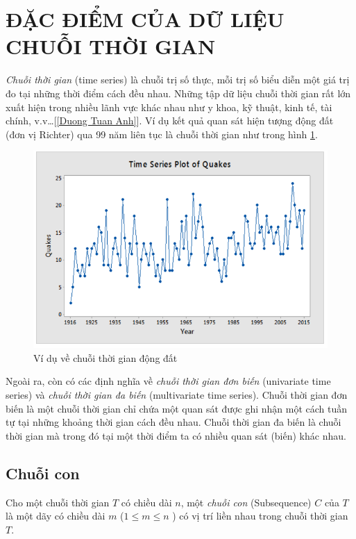 \documentclass[13pt,oneside]{scrbook}
\begin{document}
\section{ĐẶC ĐIỂM CỦA DỮ LIỆU CHUỖI THỜI GIAN}
\textit{Chuỗi thời gian} (time series) là chuỗi trị số thực, mỗi trị số biểu diễn một giá trị đo tại những thời điểm cách đều nhau. 
Những tập dữ liệu chuỗi thời gian rất lớn xuất hiện trong nhiều lãnh vực khác nhau như y khoa, kỹ thuật, kinh tế, tài chính, v.v…[\ref{Duong Tuan Anh}].
Ví dụ kết quả quan sát hiện tượng động đất (đơn vị Richter) qua 99 năm liên tục là chuỗi thời gian như trong hình \ref{HinhTimeseries.png}.
\begin{figure}[h!]
	\begin{center}
		\includegraphics[width=130mm]{HinhTimeseries.png}
		\caption{Ví dụ về chuỗi thời gian động đất} 
		\label{HinhTimeseries.png}
	\end{center}
\end{figure}

Ngoài ra, còn có các định nghĩa về \textit{chuỗi thời gian đơn biến} (univariate time
series) và \textit{chuỗi thời gian đa biến} (multivariate time series). Chuỗi thời gian đơn biến
là một chuỗi thời gian chỉ chứa một quan sát được ghi nhận một cách tuần tự tại những
khoảng thời gian cách đều nhau. Chuỗi thời gian đa biến là chuỗi thời gian mà trong đó
tại một thời điểm ta có nhiều quan sát (biến) khác nhau.
\subsection{Chuỗi con}
Cho một chuỗi thời gian $T$ có chiều dài $n$, một \textit{chuỗi con} (Subsequence) $C$ của $T$ là một dãy có chiều dài $m$ ($1 \leq m \leq n$ ) có vị trí liền nhau trong chuỗi thời gian $T$.
\end{document}
